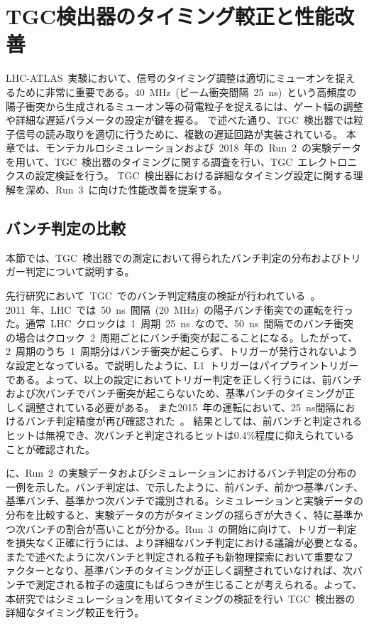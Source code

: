 \chapter{TGC検出器のタイミング較正と性能改善}
\thispagestyle{empty}
\label{chap:5}
LHC-ATLAS~実験において、信号のタイミング調整は適切にミューオンを捉えるために非常に重要である。40~MHz~(ビーム衝突間隔~25~ns)~という高頻度の陽子衝突から生成されるミューオン等の荷電粒子を捉えるには、ゲート幅の調整や詳細な遅延パラメータの設定が鍵を握る。
で述べた通り、TGC~検出器では粒子信号の読み取りを適切に行うために、複数の遅延回路が実装されている。
本章では、モンテカルロシミュレーションおよび~2018~年の~Run~2~の実験データを用いて、TGC~検出器のタイミングに関する調査を行い、TGC~エレクトロニクスの設定検証を行う。
TGC~検出器における詳細なタイミング設定に関する理解を深め、Run~3~に向けた性能改善を提案する。

\section{バンチ判定の比較}
本節では、TGC~検出器での測定において得られたバンチ判定の分布およびトリガー判定について説明する。

先行研究において~TGC~でのバンチ判定精度の検証が行われている~\cite{MT:05}。2011~年、LHC~では~50~ns~間隔~(20~MHz)~の陽子バンチ衝突での運転を行った。通常~LHC~クロックは~1~周期~25~ns~なので、50~ns~間隔でのバンチ衝突の場合はクロック~2~周期ごとにバンチ衝突が起こることになる。したがって、2~周期のうち~1~周期分はバンチ衝突が起こらず、トリガーが発行されないような設定となっている。で説明したように、L1~トリガーはパイプライントリガーである。よって、以上の設定においてトリガー判定を正しく行うには、前バンチおよび次バンチでバンチ衝突が起こらないため、基準バンチのタイミングが正しく調整されている必要がある。
また2015~年の運転において、25~ns間隔におけるバンチ判定精度が再び確認された~\cite{kishimoto}。
結果としては、前バンチと判定されるヒットは無視でき、次バンチと判定されるヒットは0.4$\%$程度に抑えられていることが確認された。

に、Run~2~の実験データおよびシミュレーションにおけるバンチ判定の分布の一例を示した。バンチ判定は、で示したように、前バンチ、前かつ基準バンチ、基準バンチ、基準かつ次バンチで識別される。シミュレーションと実験データの分布を比較すると、実験データの方がタイミングの揺らぎが大きく、特に基準かつ次バンチの割合が高いことが分かる。Run~3~の開始に向けて、トリガー判定を損失なく正確に行うには、より詳細なバンチ判定における議論が必要となる。またで述べたように次バンチと判定される粒子も新物理探索において重要なファクターとなり、基準バンチのタイミングが正しく調整されていなければ、次バンチで測定される粒子の速度にもばらつきが生じることが考えられる。よって、本研究ではシミュレーションを用いてタイミングの検証を行い~TGC~検出器の詳細なタイミング較正を行う。

